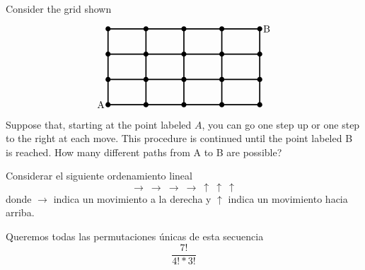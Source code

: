 \item Consider the grid shown
\[
\begin{tikzpicture}[scale=0.9]
    \draw[very thick, xstep=1.5] (0, 0) grid (6, 3);
    \foreach \i in {0, 1.5, ..., 6} {
        \foreach \j in {0, 1, 2, 3} {
            \fill (\i, \j) circle (0.1);
        }
    }
    \node[anchor=east] at (0, 0) {A};
    \node[anchor=west] at (6, 3) {B};
\end{tikzpicture}
\]
Suppose that, starting at the point labeled $A$, you can go one step up or one step to the right at each move. This procedure is continued until the point labeled B is reached. How many different paths from A to B are possible?

Considerar el siguiente ordenamiento lineal
\[ \rightarrow\ \rightarrow\ \rightarrow\ \rightarrow\ \uparrow\ \uparrow\ \uparrow \]
donde $\rightarrow$ indica un movimiento a la derecha y $\uparrow$ indica un movimiento hacia arriba.

Queremos todas las permutaciones únicas de esta secuencia
\[ \frac{7!}{4! * 3!} \]